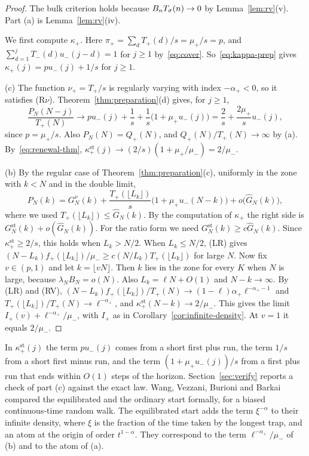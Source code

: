 \begin{proof}
The bulk criterion holds because $B_nT_\sigma(n)\to0$ by Lemma~\ref{lem:rv}(v). Part
(a) is Lemma~\ref{lem:rv}(iv).

We first compute $\kappa_\plus$. Here $\pi_\plus=\sum_dT_\plus(d)/s=\mu_\plus/s=p$, and
$\sum_{d=1}^jT_\minus(d)u_\minus(j-d)=1$ for $j\ge1$ by~\eqref{eq:cover}.
So~\eqref{eq:kappa-prep} gives $\kappa_\plus(j)=pu_\minus(j)+1/s$ for $j\ge1$.

(c) The function $\nu_\plus=T_\plus/s$ is regularly varying with index
$-\alpha_\plus<0$, so it satisfies (R$\nu$). Theorem~\ref{thm:preparation}(d) gives,
for $j\ge1$,
\[
 \frac{P_N(N-j)}{T_\plus(N)}\to pu_\minus(j)+\frac1s+\frac1s\bigl(1+\mu_\plus u_\minus(j)\bigr)
 =\frac2s+\frac{2\mu_\plus}{s}u_\minus(j),
\]
since $p=\mu_\plus/s$. Also $P_N(N)=Q_\plus(N)$, and $Q_\plus(N)/T_\plus(N)\to\infty$ by (a).
By~\eqref{eq:renewal-thm}, $\kappa^{\mathrm{st}}_\plus(j)\to(2/s)(1+\mu_\plus/\mu_\minus)=2/\mu_\minus$.

(b) By the regular case of Theorem~\ref{thm:preparation}(c), uniformly in the zone
with $k<N$ and in the double limit,
\[
 P_N(k)=G^\nu_N(k)+\frac{T_\plus(\lfloor L_k\rfloor)}{s}\bigl(1+\mu_\plus u_\minus(N-k)\bigr)
 +o\bigl(\widehat G_N(k)\bigr),
\]
where we used $T_\plus(\lfloor L_k\rfloor)\le\widehat G_N(k)$. By the computation of
$\kappa_\plus$ the right side is $G^{\mathrm{st}}_N(k)+o(\widehat G_N(k))$. For the ratio
form we need $G^{\mathrm{st}}_N(k)\ge c\widehat G_N(k)$. Since $\kappa^{\mathrm{st}}_\plus\ge2/s$,
this holds when $L_k>N/2$. When $L_k\le N/2$, (LR) gives
$(N-L_k)f_\plus(\lfloor L_k\rfloor)/\mu_\minus\ge c(N/L_k)T_\plus(\lfloor L_k\rfloor)$ for large
$N$. Now fix $v\in(p,1)$ and let $k=\lfloor vN\rfloor$. Then $k$ lies in the zone for
every $K$ when $N$ is large, because $\lambda_NB_N=o(N)$. Also $L_k=\ell N+O(1)$
and $N-k\to\infty$. By (LR) and (RV),
$(N-L_k)f_\plus(\lfloor L_k\rfloor)/T_\plus(N)\to(1-\ell)\alpha_\plus\ell^{-\alpha_\plus-1}$ and
$T_\plus(\lfloor L_k\rfloor)/T_\plus(N)\to\ell^{-\alpha_\plus}$, and
$\kappa^{\mathrm{st}}_\plus(N-k)\to2/\mu_\minus$. This gives the limit
$I_\plus(v)+\ell^{-\alpha_\plus}/\mu_\minus$, with $I_\plus$ as in
Corollary~\ref{cor:infinite-density}. At $v=1$ it equals $2/\mu_\minus$.
\end{proof}

In $\kappa^{\mathrm{st}}_\plus(j)$ the term $pu_\minus(j)$ comes from a short first plus
run, the term $1/s$ from a short first minus run, and the term $(1+\mu_\plus u_\minus(j))/s$
from a first plus run that ends within $O(1)$ steps of the horizon.
Section~\ref{sec:verify} reports a check of part (c) against the exact law.
Wang, Vezzani, Burioni and Barkai~\cite[Eqs.~(28), (46) and~(47)]{wvbb2019}
compared the equilibrated and the ordinary start formally, for a biased
continuous-time random walk. The equilibrated start adds the term $\xi^{-\alpha}$
to their infinite density, where $\xi$ is the fraction of the time taken by the
longest trap, and an atom at the origin of order $t^{1-\alpha}$. They correspond
to the term $\ell^{-\alpha_\plus}/\mu_\minus$ of (b) and to the atom of (a).

